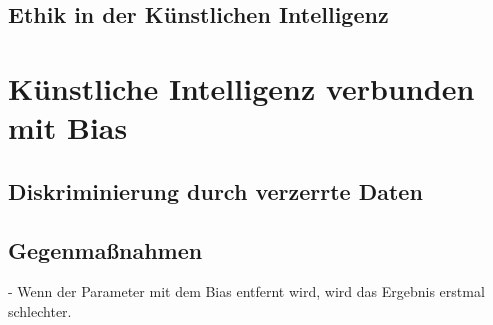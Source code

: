 \begin{onehalfspace}
        \subsection{Ethik in der Künstlichen Intelligenz}
        \label{subsubsec:ethikinderKI}

        \section{Künstliche Intelligenz verbunden mit Bias}
        \label{subsec:KIundbias}

        \subsection{Diskriminierung durch verzerrte Daten}
        \label{subsubsec:diskriminierungdurchverzerrung}

        \subsection{Gegenma{\ss}nahmen}
        \label{subsubsec:gegenmassnahmen}
            -   Wenn der Parameter mit dem Bias entfernt wird, wird das Ergebnis erstmal schlechter. 
            \\

    \newpage
    \end{onehalfspace}